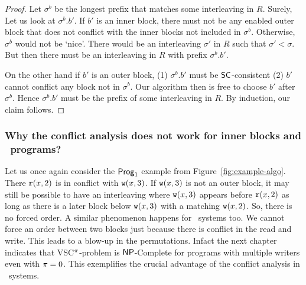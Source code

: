 \begin{proof}
Let $\sigma^b$ be the longest prefix that matches some interleaving in $R$. Surely, Let us look at $\sigma^b.b'$. If $b'$ is an inner block, there must not be any enabled outer block that does not conflict with the inner blocks not included in $\sigma^b$. Otherwise, $\sigma^b$ would not be `nice'. There would be an interleaving $\sigma'$ in $R$ such that $\sigma'<\sigma$. But then there must be an interleaving in $R$ with prefix $\sigma^b.b'$. 

On the other hand if $b'$ is an outer block, (1) $\sigma^b.b'$ must be $\mathsf{SC}$-consistent (2) $b'$ cannot conflict any block not in $\sigma^b$. Our algorithm then is free to choose $b'$ after $\sigma^b$. Hence $\sigma^b.b'$ must be the prefix of some interleaving in $R$. By induction, our claim follows.
\end{proof}
 
\subsubsection*{Why the conflict analysis does not work for inner blocks and \twowriter\ programs?}

Let us once again consider the $\mathsf{Prog}_1$ example from Figure~\ref{fig:example-algo}. There $\mathtt{r}(x,2)$ is in conflict with $\mathtt{w}(x,3)$. If $\mathtt{w}(x, 3)$ is not an outer block, it may still be possible to have an interleaving where $\mathtt{w}(x,3)$ appears before $\mathtt{r}(x,2)$ as long as there is a later block below $\mathtt{w}(x,3)$ with a matching $\mathtt{w}(x,2)$. So, there is no forced order. A similar phenomenon happens for \twowriter\ systems too. We cannot force an order between two blocks just because there is conflict in the read and write. This leads to a blow-up in the permutations. Infact the next chapter indicates that VSC$^\pi$-problem is $\mathsf{NP}$-Complete for programs with multiple writers even with $\pi = 0$. This exemplifies the crucial advantage of the conflict analysis in \onewriter\ systems.


  







\endinput
